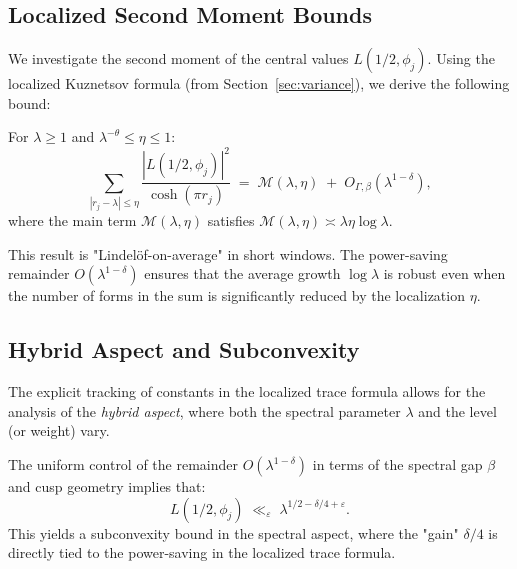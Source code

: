 \subsection{Localized Second Moment Bounds}

We investigate the second moment of the central values $L(1/2, \phi_j)$. Using the localized Kuznetsov formula (from Section~\ref{sec:variance}), we derive the following bound:

\begin{theorem}\label{thm:second-moment}
For $\lambda \ge 1$ and $\lambda^{-\theta} \le \eta \le 1$:
\begin{equation}\label{eq:second-moment-bound}
\sum_{|r_j - \lambda| \le \eta} \frac{|L(1/2, \phi_j)|^2}{\cosh(\pi r_j)} \;=\; \mathcal{M}(\lambda, \eta) \;+\; O_{\Gamma, \beta}(\lambda^{1-\delta}),
\end{equation}
where the main term $\mathcal{M}(\lambda, \eta)$ satisfies $\mathcal{M}(\lambda, \eta) \asymp \lambda \eta \log \lambda$.
\end{theorem}

This result is "Lindelöf-on-average" in short windows. The power-saving remainder $O(\lambda^{1-\delta})$ ensures that the average growth $\log \lambda$ is robust even when the number of forms in the sum is significantly reduced by the localization $\eta$.

\subsection{Hybrid Aspect and Subconvexity}

The explicit tracking of constants in the localized trace formula allows for the analysis of the \emph{hybrid aspect}, where both the spectral parameter $\lambda$ and the level (or weight) vary.

\begin{proposition}\label{prop:subconvexity}
The uniform control of the remainder $O(\lambda^{1-\delta})$ in terms of the spectral gap $\beta$ and cusp geometry implies that:
\begin{equation}
L(1/2, \phi_j) \;\ll_{\varepsilon}\; \lambda^{1/2 - \delta/4 + \varepsilon}.
\end{equation}
This yields a subconvexity bound in the spectral aspect, where the "gain" $\delta/4$ is directly tied to the power-saving in the localized trace formula.
\end{proposition}

